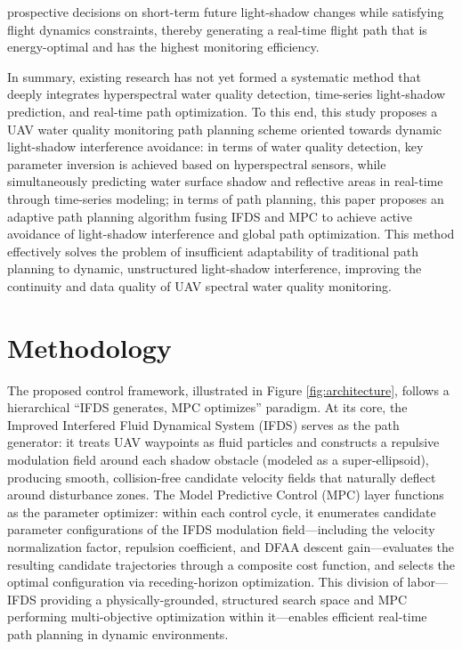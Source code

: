 \documentclass[final,3p,times,numbers]{elsarticle}
\begin{document}
prospective decisions on short-term future light-shadow changes while satisfying flight dynamics constraints, thereby generating a real-time flight path that is energy-optimal and has the highest monitoring efficiency.

In summary, existing research has not yet formed a systematic method that deeply integrates hyperspectral water quality detection, time-series light-shadow prediction, and real-time path optimization. To this end, this study proposes a UAV water quality monitoring path planning scheme oriented towards dynamic light-shadow interference avoidance: in terms of water quality detection, key parameter inversion is achieved based on hyperspectral sensors, while simultaneously predicting water surface shadow and reflective areas in real-time through time-series modeling; in terms of path planning, this paper proposes an adaptive path planning algorithm fusing IFDS and MPC to achieve active avoidance of light-shadow interference and global path optimization. This method effectively solves the problem of insufficient adaptability of traditional path planning to dynamic, unstructured light-shadow interference, improving the continuity and data quality of UAV spectral water quality monitoring.

\section{Methodology}
The proposed control framework, illustrated in Figure \ref{fig:architecture}, follows a hierarchical ``IFDS generates, MPC optimizes'' paradigm. At its core, the Improved Interfered Fluid Dynamical System (IFDS) serves as the path generator: it treats UAV waypoints as fluid particles and constructs a repulsive modulation field around each shadow obstacle (modeled as a super-ellipsoid), producing smooth, collision-free candidate velocity fields that naturally deflect around disturbance zones. The Model Predictive Control (MPC) layer functions as the parameter optimizer: within each control cycle, it enumerates candidate parameter configurations of the IFDS modulation field---including the velocity normalization factor, repulsion coefficient, and DFAA descent gain---evaluates the resulting candidate trajectories through a composite cost function, and selects the optimal configuration via receding-horizon optimization. This division of labor---IFDS providing a physically-grounded, structured search space and MPC performing multi-objective optimization within it---enables efficient real-time path planning in dynamic environments.
\end{document}
